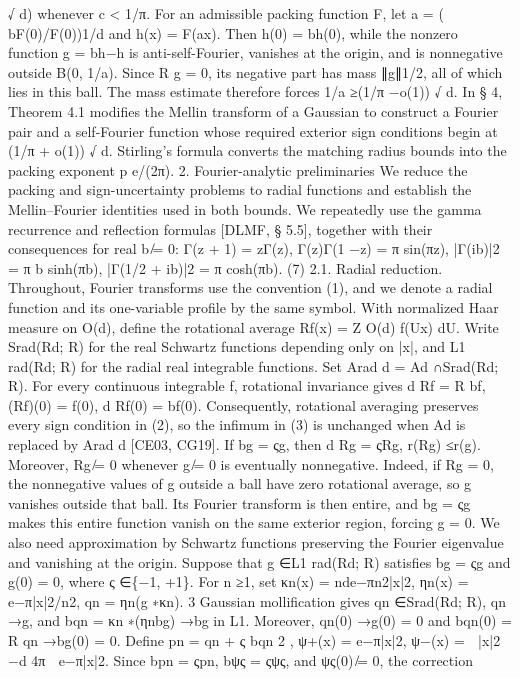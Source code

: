 √
d) whenever c < 1/π. For an admissible packing
function F, let a = ( bF(0)/F(0))1/d and h(x) = F(ax). Then h(0) = bh(0), while the nonzero
function g = bh−h is anti-self-Fourier, vanishes at the origin, and is nonnegative outside B(0, 1/a).
Since
R g = 0, its negative part has mass ∥g∥1/2, all of which lies in this ball. The mass estimate
therefore forces 1/a ≥(1/π −o(1))
√
d. In § 4, Theorem 4.1 modiﬁes the Mellin transform of
a Gaussian to construct a Fourier pair and a self-Fourier function whose required exterior sign
conditions begin at (1/π + o(1))
√
d. Stirling’s formula converts the matching radius bounds
into the packing exponent
p
e/(2π).
2. Fourier-analytic preliminaries
We reduce the packing and sign-uncertainty problems to radial functions and establish the
Mellin–Fourier identities used in both bounds. We repeatedly use the gamma recurrence and
reﬂection formulas [DLMF, § 5.5], together with their consequences for real b ̸= 0:
Γ(z + 1) = zΓ(z),
Γ(z)Γ(1 −z) =
π
sin(πz),
|Γ(ib)|2 =
π
b sinh(πb),
|Γ(1/2 + ib)|2 =
π
cosh(πb).
(7)
2.1. Radial reduction. Throughout, Fourier transforms use the convention (1), and we denote
a radial function and its one-variable proﬁle by the same symbol. With normalized Haar measure
on O(d), deﬁne the rotational average
Rf(x) =
Z
O(d)
f(Ux) dU.
Write Srad(Rd; R) for the real Schwartz functions depending only on |x|, and L1
rad(Rd; R) for the
radial real integrable functions. Set Arad
d
= Ad ∩Srad(Rd; R). For every continuous integrable
f, rotational invariance gives
d
Rf = R bf,
(Rf)(0) = f(0),
d
Rf(0) = bf(0).
Consequently, rotational averaging preserves every sign condition in (2), so the inﬁmum in (3)
is unchanged when Ad is replaced by Arad
d
[CE03, CG19]. If bg = ςg, then
d
Rg = ςRg,
r(Rg) ≤r(g).
Moreover, Rg ̸= 0 whenever g ̸= 0 is eventually nonnegative. Indeed, if Rg = 0, the nonnegative
values of g outside a ball have zero rotational average, so g vanishes outside that ball. Its Fourier
transform is then entire, and bg = ςg makes this entire function vanish on the same exterior region,
forcing g = 0.
We also need approximation by Schwartz functions preserving the Fourier eigenvalue and
vanishing at the origin. Suppose that g ∈L1
rad(Rd; R) satisﬁes bg = ςg and g(0) = 0, where
ς ∈\{−1, +1\}. For n ≥1, set
κn(x) = nde−πn2|x|2,
ηn(x) = e−π|x|2/n2,
qn = ηn(g ∗κn).
3
Gaussian molliﬁcation gives qn ∈Srad(Rd; R), qn →g, and bqn = κn ∗(ηnbg) →bg in L1. Moreover,
qn(0) →g(0) = 0 and bqn(0) =
R qn →bg(0) = 0. Deﬁne
pn = qn + ς bqn
2
,
ψ+(x) = e−π|x|2,
ψ−(x) =

|x|2 −d
4π

e−π|x|2.
Since bpn = ςpn, bψς = ςψς, and ψς(0) ̸= 0, the correction
